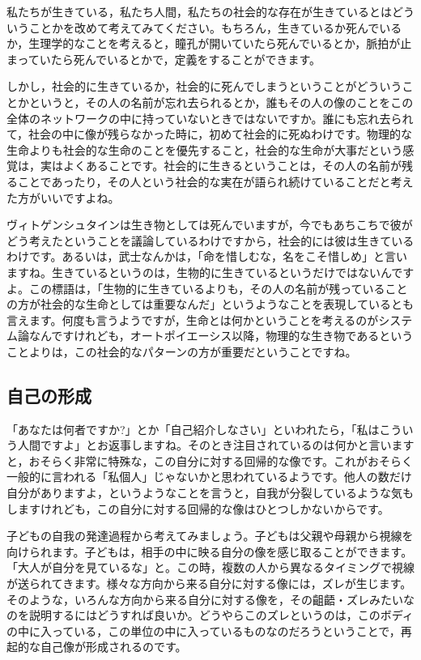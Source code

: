 \documentclass{ltjsbook}
\begin{document}
私たちが生きている，私たち人間，私たちの社会的な存在が生きているとはどういうことかを改めて考えてみてください。もちろん，生きているか死んでいるか，生理学的なことを考えると，瞳孔が開いていたら死んでいるとか，脈拍が止まっていたら死んでいるとかで，定義をすることができます。

しかし，社会的に生きているか，社会的に死んでしまうということがどういうことかというと，その人の名前が忘れ去られるとか，誰もその人の像のことをこの全体のネットワークの中に持っていないときではないですか。誰にも忘れ去られて，社会の中に像が残らなかった時に，初めて社会的に死ぬわけです。物理的な生命よりも社会的な生命のことを優先すること，社会的な生命が大事だという感覚は，実はよくあることです。社会的に生きるということは，その人の名前が残ることであったり，その人という社会的な実在が語られ続けていることだと考えた方がいいですよね。

ヴィトゲンシュタインは生き物としては死んでいますが，今でもあちこちで彼がどう考えたということを議論しているわけですから，社会的には彼は生きているわけです。あるいは，武士なんかは，「命を惜しむな，名をこそ惜しめ」と言いますね。生きているというのは，生物的に生きているというだけではないんですよ。この標語は，「生物的に生きているよりも，その人の名前が残っていることの方が社会的な生命としては重要なんだ」というようなことを表現しているとも言えます。何度も言うようですが，生命とは何かということを考えるのがシステム論なんですけれども，オートポイエーシス以降，物理的な生き物であるということよりは，この社会的なパターンの方が重要だということですね。

\subsection{自己の形成}

「あなたは何者ですか?」とか「自己紹介しなさい」といわれたら，「私はこういう人間ですよ」とお返事しますね。そのとき注目されているのは何かと言いますと，おそらく非常に特殊な，この自分に対する回帰的な像です。これがおそらく一般的に言われる「私個人」じゃないかと思われているようです。他人の数だけ自分がありますよ，というようなことを言うと，自我が分裂しているような気もしますけれども，この自分に対する回帰的な像はひとつしかないからです。

子どもの自我の発達過程から考えてみましょう。子どもは父親や母親から視線を向けられます。子どもは，相手の中に映る自分の像を感じ取ることができます。「大人が自分を見ているな」と。この時，複数の人から異なるタイミングで視線が送られてきます。様々な方向から来る自分に対する像には，ズレが生じます。そのような，いろんな方向から来る自分に対する像を，その齟齬・ズレみたいなのを説明するにはどうすれば良いか。どうやらこのズレというのは，このボディの中に入っている，この単位の中に入っているものなのだろうということで，再起的な自己像が形成されるのです\parencite{KimuraYoji}。
\end{document}
